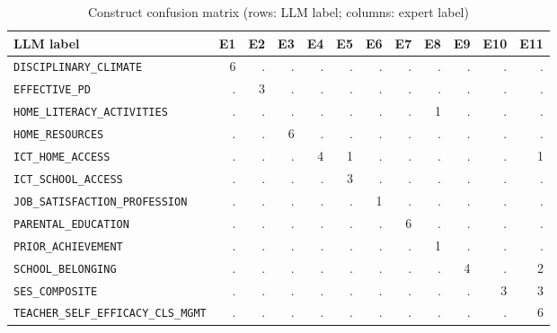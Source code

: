 \begin{table}[htbp]
\centering
\scriptsize
\caption{Construct confusion matrix (rows: LLM label; columns: expert label)}
\label{tab:C6}
\begin{tabular}{lrrrrrrrrrrr}
\toprule
LLM label & E1 & E2 & E3 & E4 & E5 & E6 & E7 & E8 & E9 & E10 & E11 \\
\midrule
\texttt{DISCIPLINARY\_CLIMATE} & 6 & . & . & . & . & . & . & . & . & . & . \\
\texttt{EFFECTIVE\_PD} & . & 3 & . & . & . & . & . & . & . & . & . \\
\texttt{HOME\_LITERACY\_ACTIVITIES} & . & . & . & . & . & . & . & 1 & . & . & . \\
\texttt{HOME\_RESOURCES} & . & . & 6 & . & . & . & . & . & . & . & . \\
\texttt{ICT\_HOME\_ACCESS} & . & . & . & 4 & 1 & . & . & . & . & . & 1 \\
\texttt{ICT\_SCHOOL\_ACCESS} & . & . & . & . & 3 & . & . & . & . & . & . \\
\texttt{JOB\_SATISFACTION\_PROFESSION} & . & . & . & . & . & 1 & . & . & . & . & . \\
\texttt{PARENTAL\_EDUCATION} & . & . & . & . & . & . & 6 & . & . & . & . \\
\texttt{PRIOR\_ACHIEVEMENT} & . & . & . & . & . & . & . & 1 & . & . & . \\
\texttt{SCHOOL\_BELONGING} & . & . & . & . & . & . & . & . & 4 & . & 2 \\
\texttt{SES\_COMPOSITE} & . & . & . & . & . & . & . & . & . & 3 & 3 \\
\texttt{TEACHER\_SELF\_EFFICACY\_CLS\_MGMT} & . & . & . & . & . & . & . & . & . & . & 6 \\
\bottomrule
\end{tabular}
\par{}
\end{table}
